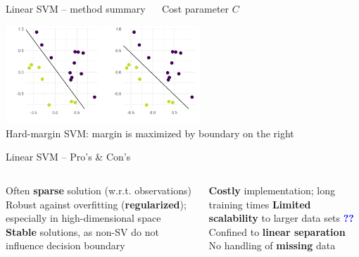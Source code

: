 \begin{vbframe}{Linear SVM -- method summary}
 ~~ Cost parameter \textbf{$C$}

\hfill

\includegraphics[width=0.55\textwidth]{
  figure/linear_classif_1.png}  \\
  \tiny{Hard-margin SVM: margin is maximized by boundary on the right}
  \normalsize

\end{vbframe}


\begin{frame}{Linear SVM -- Pro's \& Con's}

\begin{columns}[onlytextwidth]
  \begin{column}{0.5\textwidth}
    \footnotesize
    \begin{itemize}
      \positem Often \textbf{sparse} solution (w.r.t. observations)
      \positem Robust against overfitting (\textbf{regularized}); especially in 
      high-dimensional space
      \positem \textbf{Stable} solutions, as non-SV do not influence decision 
      boundary
    \end{itemize}
  \end{column}

  \begin{column}{0.5\textwidth}
    \footnotesize
    \begin{itemize}
      \negitem \textbf{Costly} implementation; long training times
      \negitem \textbf{Limited scalability} to larger data sets 
      \textcolor{blue}{\textbf{??}}
      \negitem Confined to \textbf{linear separation}
      \negitem No handling of \textbf{missing} data
    \end{itemize}
  \end{column}
\end{columns}

\vfill

\small


\end{frame}

